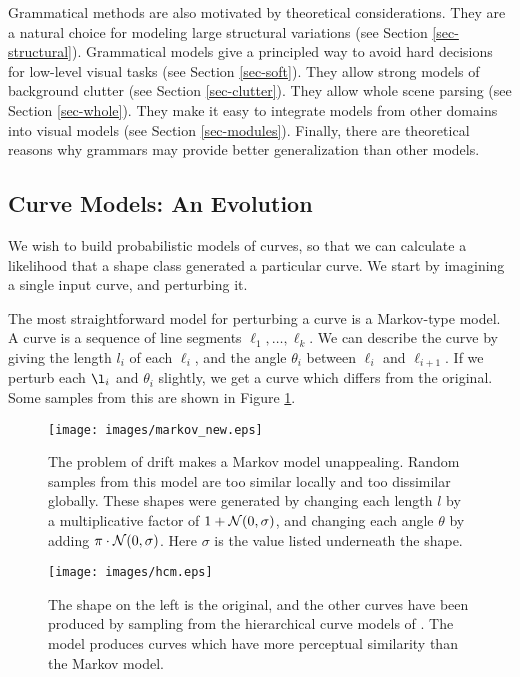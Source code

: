 \documentclass{article}
\begin{document}
Grammatical methods are also motivated by theoretical
considerations. They are a natural choice for modeling large
structural variations (see Section \ref{sec-structural}). Grammatical
models give a principled way to avoid hard decisions for low-level
visual tasks (see Section \ref{sec-soft}). They allow strong models of
background clutter (see Section \ref{sec-clutter}). They allow whole
scene parsing (see Section \ref{sec-whole}). They make it easy to
integrate models from other domains into visual models (see Section
\ref{sec-modules}). Finally, there are theoretical reasons why
grammars may provide better generalization than other models.

\subsection{Curve Models: An Evolution}

We wish to build probabilistic models of curves, so that we can
calculate a likelihood that a shape class generated a particular
curve. We start by imagining a single input curve, and perturbing it.

The most straightforward model for perturbing a curve is a Markov-type
model. A curve is a sequence of line segments
$\ell_1,\dots,\ell_k$. We can describe the curve by giving the length
$l_i$ of each $\ell_i$, and the angle $\theta_i$ between $\ell_i$ and
$\ell_{i+1}$. If we perturb each $\l_i$ and $\theta_i$ slightly, we
get a curve which differs from the original. Some samples from this
are shown in Figure \ref{fig-markov}.
\begin{figure}
  \centering
\texttt{[image: images/markov\_new.eps]}
\caption{The problem of drift makes a Markov model unappealing. Random
  samples from this model are too similar locally and too dissimilar
  globally. These shapes were generated by changing each length $l$ by
  a multiplicative factor of $1 + {\mathcal N}(0,\sigma)$, and changing each
  angle $\theta$ by adding $\pi \cdot {\mathcal N}(0,\sigma )$. Here $\sigma$
  is the value listed underneath the shape.}
\label{fig-markov}
\end{figure}

\begin{figure}
  \centering
\texttt{[image: images/hcm.eps]}
\caption{The shape on the left is the original, and the other curves
  have been produced by sampling from the hierarchical curve models of
  \cite{hcm}. The model produces curves which have more perceptual
  similarity than the Markov model. }
\label{fig-hcm}
\end{figure}
\end{document}

